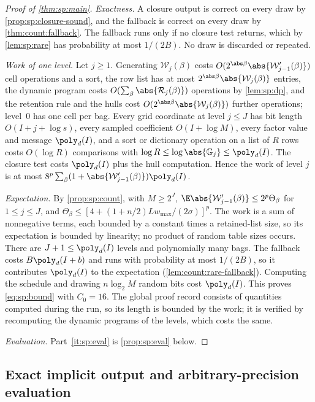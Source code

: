 \begin{proof}[Proof of \cref{thm:sp:main}]
\emph{Exactness.} A closure output is correct on every draw by
\cref{prop:sp:closure-sound}, and the fallback is correct on every draw by
\cref{thm:count:fallback}. The fallback runs only if no closure test returns,
which by \cref{lem:sp:rare} has probability at most $1/(2B)$. No draw is
discarded or repeated.

\emph{Work of one level.} Let $j\ge1$. Generating $\mathcal W_j(\beta)$ costs
$O(2^{\abs\beta}\abs{\mathcal W'_{j-1}(\beta)})$ cell operations and a sort,
the row list has at most $2^{\abs\beta}\abs{\mathcal W_j(\beta)}$ entries, the
dynamic program costs $O(\sum_\beta\abs{\mathcal R_j(\beta)})$ operations by
\cref{lem:sp:dp}, and the retention rule and the hulls cost
$O(2^{\abs\beta}\abs{\mathcal W_j(\beta)})$ further operations; level~$0$ has
one cell per bag. Every grid coordinate at level $j\le J$ has bit length
$O(I+j+\log s)$, every sampled coefficient $O(I+\log M)$, every factor value
and message $\poly_d(I)$, and a sort or dictionary operation on a list of
$R$ rows costs $O(\log R)$ comparisons with $\log R\le\log\abs{\mathbb G_j}
\le\poly_d(I)$. The closure test costs $\poly_d(I)$ plus the hull
computation. Hence the work of level $j$ is at most
$8^p\sum_\beta(1+\abs{\mathcal W'_{j-1}(\beta)})\poly_d(I)$.

\emph{Expectation.} By \cref{prop:sp:count}, with $M\ge2^J$,
$\E\abs{\mathcal W'_{j-1}(\beta)}\le2^p\Theta_\beta$ for $1\le j\le J$, and
$\Theta_\beta\le[4+(1+n/2)Lw_{\max}/(2\sigma)]^p$. The work is a sum of
nonnegative terms, each bounded by a constant times a retained-list size,
so its expectation is bounded by linearity; no product of random table
sizes occurs. There are $J+1\le\poly_d(I)$ levels and polynomially many
bags. The fallback costs $B\poly_d(I+b)$ and runs with probability at most
$1/(2B)$, so it contributes $\poly_d(I)$ to the expectation
(\cref{lem:count:rare-fallback}). Computing the schedule and drawing
$n\log_2M$ random bits cost $\poly_d(I)$. This proves \eqref{eq:sp:bound}
with $C_0=16$. The global proof record consists of quantities computed
during the run, so its length is bounded by the work; it is verified by
recomputing the dynamic programs of the levels, which costs the same.

\emph{Evaluation.} Part~\ref{it:sp:eval} is \cref{prop:sp:eval} below.
\end{proof}

\subsection{Exact implicit output and arbitrary-precision evaluation}\label{sec:sp:eval}

